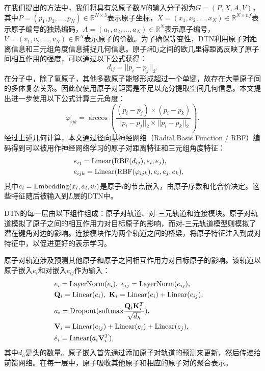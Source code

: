
在我们提出的方法中，我们将具有总原子数$N$的输入分子视为$G = (P, X, A, V)$，其中$P = (p_1, p_2, ..., p_N) \in \mathbb{R}^{N \times 3}$表示原子坐标，$X = (x_1, x_2, ..., x_N) \in \mathbb{R}^{N \times nf}$表示原子编号的独热编码，$A = (a_1, a_2, ..., a_N) \in \mathbb{R}^{N}$表示原子编号，$V = (v_1, v_2, ..., v_N) \in \mathbb{R}^{N}$表示原子的价数。为了确保等变性，DTN利用原子对距离信息和三元组角度信息捕捉几何信息。原子$i$和$j$之间的欧几里得距离反映了原子间相互作用的强度，可以通过以下公式获得：
\begin{equation}
    d_{ij} = ||p_i - p_j||_2.
\end{equation}
在分子中，除了氢原子，其他多数原子能够形成超过一个单键，故存在大量原子间的多体复杂关系。因此仅使用原子对距离是不足以充分提取空间几何信息。本文提出进一步使用以下公式计算三元角度：
\begin{equation}
    \varphi_{ijk} = \arccos (\frac{(p_i - p_j) \times (p_i - p_k)}{||p_i - p_j||_2 \times ||p_i - p_k||_2}). 
\end{equation}
经过上述几何计算，本文通过径向基神经网络（Radial Basis Function / RBF）编码得到可以被用作神经网络学习的原子对距离特征和三元组角度特征：
\begin{eqnarray}
    &e_{ij} = {\rm Linear}({\rm RBF}(d_{ij}), e_i, e_j),& \\
    &e_{ijk} = {\rm Linear}({\rm RBF}(\varphi_{ijk}), e_i, e_j, e_k),&
\end{eqnarray}
其中$e_i = {\rm Embedding}(x_i, a_i, v_i)$是原子$i$的节点嵌入，由原子序数和化合价决定。这些特征随后被输入到$L$层的DTN中。

DTN的每一层由以下组件组成：原子对轨道、对-三元轨道和连接模块。原子对轨道模拟了原子之间的相互作用力对目标原子的影响，而对-三元轨道模型则模拟了潜在键角对边的影响。连接模块作为两个轨道之间的桥梁，将原子特征注入到成对特征中，以促进更好的表示学习。

原子对轨道涉及预测其他原子和原子之间相互作用力对目标原子的影响。该轨道以原子嵌入$e_i$和对嵌入$e_{ij}$作为输入：
\begin{eqnarray}
    &e_i = {\rm LayerNorm}(e_i), \ e_{ij} = {\rm LayerNorm}(e_{ij}),& \\
    &\mathbf{Q}_i = {\rm Linear}(e_i), \ \mathbf{K}_i = {\rm Linear}(e_i) + {\rm Linear}(e_{ij}),& \\
    &a_i = {\rm Dropout}({\rm softmax} \frac{\mathbf{Q}_i \mathbf{K}_i^T}{\sqrt{d_h}}), & \\
    &\mathbf{V}_i = {\rm Linear}(e_{ij}) + {\rm Linear}(e_{i}) + {\rm Linear}(e_{j}),& \\
    &\hat{e}_i = {\rm Linear}(a_i \mathbf{V}_i^T),&
\end{eqnarray}
其中$d_h$是头的数量。原子嵌入首先通过添加原子对轨道的预测来更新，然后传递给前馈网络。在每一层中，原子吸收其他原子和相应的原子对的聚合表示。


